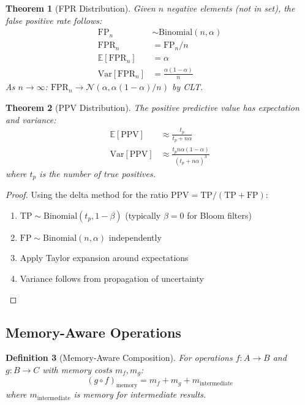 \documentclass[11pt,final]{article}
\newcommand{\FPR}{\text{FPR}}
\newcommand{\PPV}{\text{PPV}}
\newcommand{\Expect}{\mathbb{E}}
\newcommand{\Var}{\text{Var}}
\newcommand{\bindist}{\text{Binomial}}
\newtheorem{theorem}{Theorem}[section]
\newtheorem{definition}[theorem]{Definition}
\begin{document}
\begin{theorem}[FPR Distribution]
Given $n$ negative elements (not in set), the false positive rate follows:
\begin{align}
\text{FP}_n &\sim \bindist(n, \alpha) \\
\FPR_n &= \text{FP}_n/n \\
\Expect[\FPR_n] &= \alpha \\
\Var[\FPR_n] &= \frac{\alpha(1-\alpha)}{n}
\end{align}
As $n \to \infty$: $\FPR_n \to \mathcal{N}(\alpha, \alpha(1-\alpha)/n)$ by CLT.
\end{theorem}

\begin{theorem}[PPV Distribution]
The positive predictive value has expectation and variance:
\begin{align}
\Expect[\PPV] &\approx \frac{t_p}{t_p + n\alpha} \\
\Var[\PPV] &\approx \frac{t_p n \alpha(1-\alpha)}{(t_p + n\alpha)^3}
\end{align}
where $t_p$ is the number of true positives.
\end{theorem}

\begin{proof}
Using the delta method for the ratio $\PPV = \text{TP}/(\text{TP} + \text{FP})$:
\begin{enumerate}
    \item $\text{TP} \sim \bindist(t_p, 1-\beta)$ (typically $\beta = 0$ for Bloom filters)
    \item $\text{FP} \sim \bindist(n, \alpha)$ independently
    \item Apply Taylor expansion around expectations
    \item Variance follows from propagation of uncertainty
\end{enumerate}
\end{proof}

\subsection{Memory-Aware Operations}

\begin{definition}[Memory-Aware Composition]
For operations $f: A \to B$ and $g: B \to C$ with memory costs $m_f, m_g$:
\begin{equation}
(g \circ f)_{\text{memory}} = m_f + m_g + m_{\text{intermediate}}
\end{equation}
where $m_{\text{intermediate}}$ is memory for intermediate results.
\end{definition}
\end{document}
